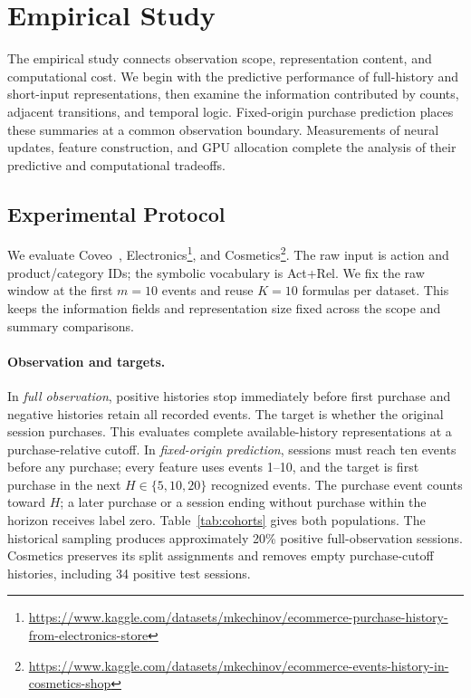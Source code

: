 \documentclass[sigconf,anonymous,nonacm]{acmart}
\newif\ifrevisions
\newcommand{\rev}[1]{\ifrevisions\textcolor{red}{#1}\else#1\fi}
\newenvironment{revblock}{\begingroup\ifrevisions\color{red}\fi}{\endgroup}
\begin{document}
\begin{revblock}
\section{Empirical Study}
\label{sec:empirical}
The empirical study connects observation scope, representation content, and computational cost. We begin with the predictive performance of full-history and short-input representations, then examine the information contributed by counts, adjacent transitions, and temporal logic. Fixed-origin purchase prediction places these summaries at a common observation boundary. Measurements of neural updates, feature construction, and GPU allocation complete the analysis of their predictive and computational tradeoffs.

\subsection{Experimental Protocol}
\label{sec:settings}\label{sec:implementation}
We evaluate Coveo~\cite{CoveoSIGIR2021}, Electronics\footnote{\rev{\url{https://www.kaggle.com/datasets/mkechinov/ecommerce-purchase-history-from-electronics-store}}}, and Cosmetics\footnote{\rev{\url{https://www.kaggle.com/datasets/mkechinov/ecommerce-events-history-in-cosmetics-shop}}}. The raw input is action and product/category IDs; the symbolic vocabulary is Act+Rel. We fix the raw window at the first $m=10$ events and reuse $K=10$ formulas per dataset. This keeps the information fields and representation size fixed across the scope and summary comparisons.

\begin{table}[t]
\centering\small\setlength{\tabcolsep}{4pt}
\caption{\rev{Evaluation cohorts, split seed 42. $\pi_{\rm full}$ and $\pi_{10}$ are test positive percentages for full observation and next-ten-event prediction, respectively. The three future horizons share the same event-10 cohort.}}
\label{tab:cohorts}

\end{table}

\paragraph{Observation and targets.}
In \emph{full observation}, positive histories stop immediately before first purchase and negative histories retain all recorded events. The target is whether the original session purchases. This evaluates complete available-history representations at a purchase-relative cutoff. In \emph{fixed-origin prediction}, sessions must reach ten events before any purchase; every feature uses events 1--10, and the target is first purchase in the next $H\in\{5,10,20\}$ recognized events. The purchase event counts toward $H$; a later purchase or a session ending without purchase within the horizon receives label zero. Table~\ref{tab:cohorts} gives both populations. The historical sampling produces approximately 20\% positive full-observation sessions. Cosmetics preserves its split assignments and removes empty purchase-cutoff histories, including 34 positive test sessions.


\end{revblock}
\end{document}
